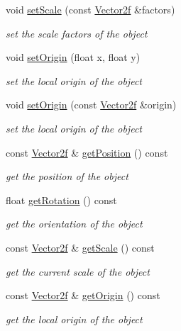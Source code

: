 \begin{DoxyCompactItemize}
void \hyperlink{classsf_1_1_transformable_a4c48a87f1626047e448f9c1a68ff167e}{set\+Scale} (const \hyperlink{classsf_1_1_vector2}{Vector2f} \&factors)
\begin{DoxyCompactList}\small\item\em set the scale factors of the object \end{DoxyCompactList}\item 
void \hyperlink{classsf_1_1_transformable_a56c67bd80aae8418d13fb96c034d25ec}{set\+Origin} (float x, float y)
\begin{DoxyCompactList}\small\item\em set the local origin of the object \end{DoxyCompactList}\item 
void \hyperlink{classsf_1_1_transformable_aa93a835ffbf3bee2098dfbbc695a7f05}{set\+Origin} (const \hyperlink{classsf_1_1_vector2}{Vector2f} \&origin)
\begin{DoxyCompactList}\small\item\em set the local origin of the object \end{DoxyCompactList}\item 
const \hyperlink{classsf_1_1_vector2}{Vector2f} \& \hyperlink{classsf_1_1_transformable_a73f9739bc6e74db2cea154bc8e94ec46}{get\+Position} () const
\begin{DoxyCompactList}\small\item\em get the position of the object \end{DoxyCompactList}\item 
float \hyperlink{classsf_1_1_transformable_aa00b5c5d4a06ac24a94dd72c56931d3a}{get\+Rotation} () const
\begin{DoxyCompactList}\small\item\em get the orientation of the object \end{DoxyCompactList}\item 
const \hyperlink{classsf_1_1_vector2}{Vector2f} \& \hyperlink{classsf_1_1_transformable_a73819fdea80ca8a06fad8a0067b4588c}{get\+Scale} () const
\begin{DoxyCompactList}\small\item\em get the current scale of the object \end{DoxyCompactList}\item 
const \hyperlink{classsf_1_1_vector2}{Vector2f} \& \hyperlink{classsf_1_1_transformable_a37ea3500afac234814a43ce809ef264e}{get\+Origin} () const
\begin{DoxyCompactList}\small\item\em get the local origin of the object \end{DoxyCompactList}\item 

\end{DoxyCompactItemize}
